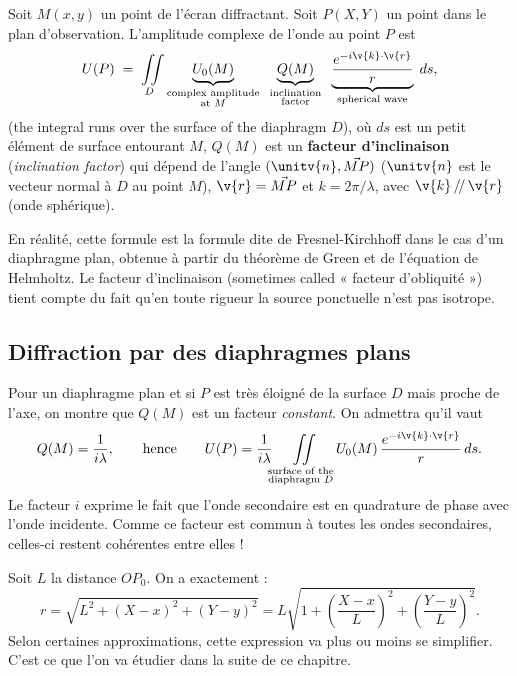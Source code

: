 \begin{definition}
  Soit $M(x,y)$ un point de l'écran diffractant. Soit $P(X,Y)$ un point dans le
  plan d'observation. L'amplitude complexe de l'onde au point $P$ est
  \[
    U(P) \;=\; \iint\limits_{D}
      \underbrace{U_0(M)}_{\substack{\text{complex amplitude}\\ \text{at } M}}
      \;\;\underbrace{Q(M)}_{\substack{\text{inclination}\\ \text{factor}}}
      \;\;\underbrace{\frac{e^{-i\v{k}\cdot\v{r}}}{r}}_{\text{spherical wave}}\; ds ,
  \]
  (the integral runs over the surface of the diaphragm $D$), où $ds$ est un
  petit élément de surface entourant $M$, $Q(M)$ est un \textbf{facteur
  d'inclinaison} (\textit{inclination factor}) qui dépend de l'angle
  $(\unitv{n}, \vec{MP})$ ($\unitv{n}$ est le vecteur normal à $D$ au point
  $M$), $\v{r} = \vec{MP}$ et $k = 2\pi/\lambda$, avec $\v{k} \,/\!/\, \v{r}$
  (onde sphérique).
\end{definition}

\begin{remark}
  En réalité, cette formule est la formule dite de Fresnel-Kirchhoff dans le cas
  d'un diaphragme plan, obtenue à partir du théorème de Green et de l'équation
  de Helmholtz. Le facteur d'inclinaison (sometimes called « facteur
  d'obliquité ») tient compte du fait qu'en toute rigueur la source ponctuelle
  n'est pas isotrope.
\end{remark}

\subsection{Diffraction par des diaphragmes plans}

Pour un diaphragme plan et si $P$ est très éloigné de la surface $D$ mais proche
de l'axe, on montre que $Q(M)$ est un facteur \emph{constant}. On admettra
qu'il vaut
\[
  Q(M) = \frac{1}{i\lambda},
  \qquad\text{hence}\qquad
  U(P) = \frac{1}{i\lambda}
  \iint\limits_{\substack{\text{surface of the}\\ \text{diaphragm } D}}
  U_0(M)\, \frac{e^{-i\v{k}\cdot\v{r}}}{r}\, ds .
\]
Le facteur $i$ exprime le fait que l'onde secondaire est en quadrature de phase
avec l'onde incidente. Comme ce facteur est commun à toutes les ondes
secondaires, celles-ci restent cohérentes entre elles !

Soit $L$ la distance $OP_0$. On a exactement :
\begin{equation*}
  r = \sqrt{L^2 + (X-x)^2 + (Y-y)^2}
    = L\sqrt{1 + \left(\frac{X-x}{L}\right)^2 + \left(\frac{Y-y}{L}\right)^2}.
\end{equation*}
Selon certaines approximations, cette expression va plus ou moins se simplifier.
C'est ce que l'on va étudier dans la suite de ce chapitre.

